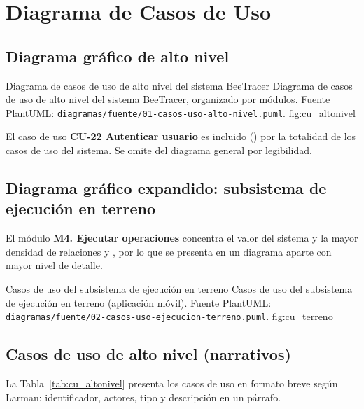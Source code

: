 \chapter{Diagrama de Casos de Uso}
\label{cap:casosuso}

\section{Diagrama gráfico de alto nivel}
\label{sec:cu_altonivel}

{Diagrama de casos de uso de alto nivel del sistema BeeTracer}
{Diagrama de casos de uso de alto nivel del sistema BeeTracer, organizado por módulos.
Fuente PlantUML: \texttt{diagramas/fuente/01-casos-uso-alto-nivel.puml}.}
{fig:cu_altonivel}

\begin{nota}
El caso de uso \textbf{CU-22 Autenticar usuario} es incluido () por la totalidad de
los casos de uso del sistema. Se omite del diagrama general por legibilidad.
\end{nota}

\section{Diagrama gráfico expandido: subsistema de ejecución en terreno}
\label{sec:cu_terreno}

El módulo \textbf{M4. Ejecutar operaciones} concentra el valor del sistema y la mayor densidad de
relaciones  y , por lo que se presenta en un diagrama aparte con mayor
nivel de detalle.

{Casos de uso del subsistema de ejecución en terreno}
{Casos de uso del subsistema de ejecución en terreno (aplicación móvil).
Fuente PlantUML: \texttt{diagramas/fuente/02-casos-uso-ejecucion-terreno.puml}.}
{fig:cu_terreno}

\section{Casos de uso de alto nivel (narrativos)}
\label{sec:cu_narrativos}

La Tabla~\ref{tab:cu_altonivel} presenta los casos de uso en formato breve según Larman:
identificador, actores, tipo y descripción en un párrafo.

